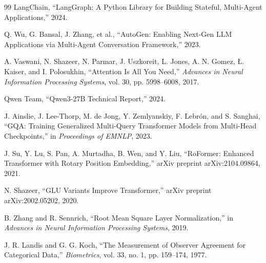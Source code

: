 \documentclass[12pt,a4paper,openany]{report}
\begin{document}
\begin{thebibliography}{99}
 LangChain, ``LangGraph: A Python Library for Building Stateful, Multi-Agent Applications,'' 2024.

 Q. Wu, G. Bansal, J. Zhang, et al., ``AutoGen: Enabling Next-Gen LLM Applications via Multi-Agent Conversation Framework,'' 2023.

 A. Vaswani, N. Shazeer, N. Parmar, J. Uszkoreit, L. Jones, A. N. Gomez, \L. Kaiser, and I. Polosukhin, ``Attention Is All You Need,'' \textit{Advances in Neural Information Processing Systems}, vol. 30, pp. 5998--6008, 2017.

 Qwen Team, ``Qwen3-27B Technical Report,'' 2024.

 J. Ainslie, J. Lee-Thorp, M. de Jong, Y. Zemlyanskiy, F. Lebr\'{o}n, and S. Sanghai, ``GQA: Training Generalized Multi-Query Transformer Models from Multi-Head Checkpoints,'' in \textit{Proceedings of EMNLP}, 2023.

 J. Su, Y. Lu, S. Pan, A. Murtadha, B. Wen, and Y. Liu, ``RoFormer: Enhanced Transformer with Rotary Position Embedding,'' arXiv preprint arXiv:2104.09864, 2021.

 N. Shazeer, ``GLU Variants Improve Transformer,'' arXiv preprint arXiv:2002.05202, 2020.

 B. Zhang and R. Sennrich, ``Root Mean Square Layer Normalization,'' in \textit{Advances in Neural Information Processing Systems}, 2019.

 J. R. Landis and G. G. Koch, ``The Measurement of Observer Agreement for Categorical Data,'' \textit{Biometrics}, vol. 33, no. 1, pp. 159--174, 1977.

\end{thebibliography}
\end{document}

